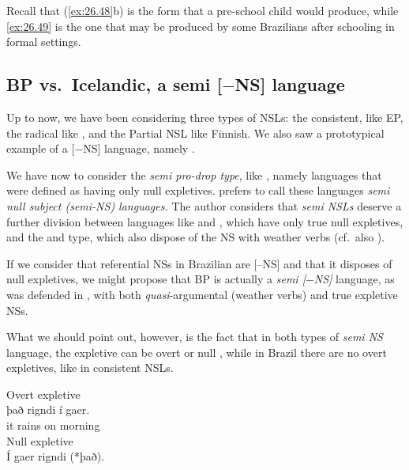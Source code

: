 \documentclass[output=paper]{langsci/langscibook}
\begin{document}
Recall that (\ref{ex:26.48}b) is the form that a pre-school child would
produce, while \eqref{ex:26.49} is the one that may be produced  by some
Brazilians after schooling in formal settings.

\subsection{BP vs.\ Icelandic, a semi [$-$NS] language}\label{sec:26.3.5}

Up to now, we have been considering three types of \gls{NSL}s: the consistent,
like \gls{EP}, the radical like , and the
Partial \gls{NSL} like Finnish. We also saw a prototypical example of a [$-$NS]
language, namely .

We have now to consider the \emph{semi pro-drop type}, like ,
namely languages that were defined as having only null expletives.
\citet{Biberauer2010} prefers to call these languages \emph{semi null subject
(semi-NS) languages.} The author considers that \emph{semi NSLs} deserve a
further division between languages like  and , which
have only true null expletives, and the  and  type, which also
dispose of the NS with weather verbs (cf.\ also \citealt{Huang2000}).

If we consider that referential NSs in Brazilian  are [–NS]
and that it disposes of null expletives, we might propose that
\gls{BP} is actually a \textit{semi [$-$NS]}
language, as was defended in \citet{Saab2016}, with both
\emph{quasi}-argumental  (weather verbs) and true expletive NSs.

What we should point out, however, is the fact that in both types of
\emph{semi NS} language, the expletive can be overt or
null \citep{Biberauer2010}, while in Brazil there are no overt expletives, like
in consistent \gls{NSL}s.

\ea%
    \label{ex:26.50ice}
    \ea Overt expletive\\
    \gll    það rigndi í  gaer.\\
            it rains on morning\\
    \ex Null expletive\\
        Í gaer rigndi  (*það).
    \z
\z
\end{document}
